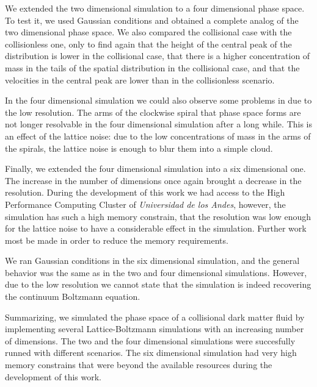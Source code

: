We extended the two dimensional simulation to a four dimensional phase space. To test it, we used Gaussian conditions and obtained a complete analog of the two dimensional phase space. We also compared the collisional case with the collisionless one, only to find again that the height of the central peak of the distribution is lower in the collisional case, that there is a higher concentration of mass in the tails of the spatial distribution in the collisional case, and that the velocities in the central peak are lower than in the collisionless scenario.

In the four dimensional simulation we could also observe some problems in due to the low resolution. The arms of the clockwise spiral that phase space forms are not longer resolvable in the four dimensional simulation after a long while. This is an effect of the lattice noise: due to the low concentrations of mass in the arms of the spirals, the lattice noise is enough to blur them into a simple cloud. 

Finally, we extended the four dimensional simulation into a six dimensional one. The increase in the number of dimensions once again brought a decrease in the resolution. During the development of this work we had access to the High Performance Computing Cluster of \emph{Universidad de los Andes}, however, the simulation has such a high memory constrain, that the resolution was low enough for the lattice noise to have a considerable effect in the simulation. Further work most be made in order to reduce the memory requirements. 

We ran Gaussian conditions in the six dimensional simulation, and the general behavior was the same as in the two and four dimensional simulations. However, due to the low resolution we cannot state that the simulation is indeed recovering the continuum Boltzmann equation. 

Summarizing, we simulated the phase space of a collisional dark matter fluid by implementing several Lattice-Boltzmann simulations with an increasing number of dimensions. The two and the four dimensional simulations were succesfully runned with different scenarios. The six dimensional simulation had very high memory constrains that were beyond the available resources during the development of this work.
